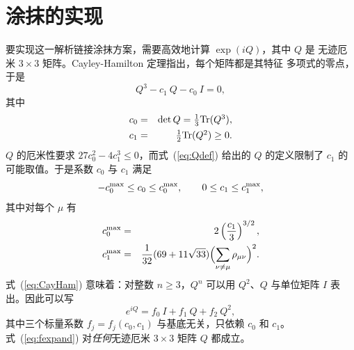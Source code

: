 \section{涂抹的实现}
\label{sec:implement}

要实现这一解析链接涂抹方案，需要高效地计算 $\exp( i Q)$，其中 $Q$ 是
无迹厄米 $3\times 3$ 矩阵。Cayley-Hamilton 定理指出，每个矩阵都是其特征
多项式的零点，于是
\begin{equation}
  Q^3 - c_1\ Q - c_0\ I = 0,
\label{eq:CayHam}
\end{equation}
其中
\begin{eqnarray}
 c_0 &=&  \det Q=\textstyle\frac{1}{3}\mbox{Tr}(Q^3),\\
 c_1 &=& \textstyle\frac{1}{2} \mbox{Tr}(Q^2)\geq 0.
\end{eqnarray}
$Q$ 的厄米性要求 $27c_0^2-4c_1^3\leq 0$，而式~(\ref{eq:Qdef}) 给出的
$Q$ 的定义限制了 $c_1$ 的可能取值。于是系数 $c_0$ 与 $c_1$ 满足
\begin{equation}
 -c_0^{\rm max}\leq c_0 \leq c_0^{\rm max},\qquad
0 \leq c_1 \leq c_1^{\rm max},
\end{equation}
其中对每个 $\mu$ 有
\begin{eqnarray}
 c_0^{\rm max}&=&2\left(\frac{c_1}{3}\right)^{3/2},\\
  c_1^{\rm max} &=& \frac{1}{32}
  (69+11\sqrt{33})\Bigl(\displaystyle\sum_{\nu\neq\mu}
\rho_{\mu\nu}\Bigr)^2.
\end{eqnarray}
式~(\ref{eq:CayHam}) 意味着：对整数 $n\geq 3$，$Q^n$ 可以用 $Q^2$、$Q$
与单位矩阵 $I$ 表出。因此可以写
\begin{equation}
 e^{i Q} = f_0\ I + f_1\ Q + f_2\ Q^2,
\label{eq:fexpand}
\end{equation}
其中三个标量系数 $f_j=f_j(c_0,c_1)$ 与基底无关，只依赖 $c_0$ 和 $c_1$。
式~(\ref{eq:fexpand}) 对{\em 任何\/}无迹厄米 $3\times 3$ 矩阵 $Q$ 都成立。

